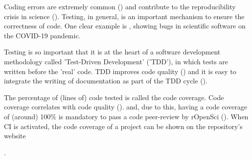 
Coding errors are extremely common (\cite{baggerly2009deriving, vable2021code})
and contribute to the reproducibility crisis in science (\cite{vable2021code}).
Testing, in general, is an important mechanism to ensure
the correctness of code.
One clear example is \cite{rahman2020exploratory}, 
showing bugs in scientific software on the COVID-19 pandemic.


Testing is so important that it is at the
heart of a software development methodology called 'Test-Driven 
Development' ('TDD'), in which tests are written
before the 'real' code.
TDD improves code quality (\cite{alkaoud2018quality,janzen2006test})
and it is easy to integrate 
the writing of documentation as part of the TDD cycle (\cite{shmerlin2015document}).


The percentage of (lines of) code tested is called the code coverage.
Code coverage correlates with code quality (\cite{horgan1994,del1995correlation}).
and, due to this, having a code coverage of (around) 100\% 
is mandatory to pass a code peer-review
by rOpenSci (\cite{ram2018community}).
When CI is activated, 
the code coverage of a project can be shown on the repository's website

.

